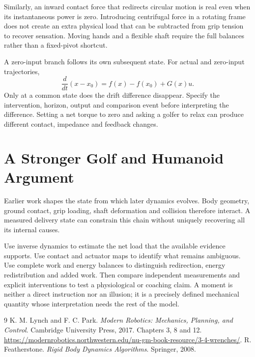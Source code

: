 \documentclass[11pt,a4paper]{article}
\begin{document}
Similarly, an inward contact force that redirects circular motion is real even when its instantaneous power is zero. Introducing centrifugal force in a rotating frame does not create an extra physical load that can be subtracted from grip tension to recover sensation. Moving hands and a flexible shaft require the full balances rather than a fixed-pivot shortcut.

A zero-input branch follows its own subsequent state. For actual and zero-input trajectories,
\begin{equation}
\frac{d}{dt}(x-x_0)=f(x)-f(x_0)+G(x)u.
\end{equation}
Only at a common state does the drift difference disappear. Specify the intervention, horizon, output and comparison event before interpreting the difference. Setting a net torque to zero and asking a golfer to relax can produce different contact, impedance and feedback changes.

\section{A Stronger Golf and Humanoid Argument}
Earlier work shapes the state from which later dynamics evolves. Body geometry, ground contact, grip loading, shaft deformation and collision therefore interact. A measured delivery state can constrain this chain without uniquely recovering all its internal causes.

Use inverse dynamics to estimate the net load that the available evidence supports. Use contact and actuator maps to identify what remains ambiguous. Use complete work and energy balances to distinguish redirection, energy redistribution and added work. Then compare independent measurements and explicit interventions to test a physiological or coaching claim. A moment is neither a direct instruction nor an illusion; it is a precisely defined mechanical quantity whose interpretation needs the rest of the model.

\begin{thebibliography}{9}
 K. M. Lynch and F. C. Park. \emph{Modern Robotics: Mechanics, Planning, and Control}. Cambridge University Press, 2017. Chapters 3, 8 and 12. \url{https://modernrobotics.northwestern.edu/nu-gm-book-resource/3-4-wrenches/}.
 R. Featherstone. \emph{Rigid Body Dynamics Algorithms}. Springer, 2008.
\end{thebibliography}
\end{document}
